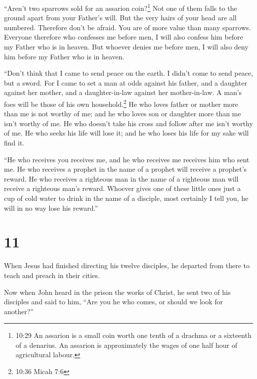  ``Aren't two sparrows sold for an assarion
coin?\footnote{10:29 An assarion is a small coin worth one tenth of a
  drachma or a sixteenth of a denarius. An assarion is approximately the
  wages of one half hour of agricultural labour.} Not one of them falls
to the ground apart from your Father's will.  But the very
hairs of your head are all numbered.  Therefore don't be
afraid. You are of more value than many sparrows.  Everyone
therefore who confesses me before men, I will also confess him before my
Father who is in heaven.  But whoever denies me before men,
I will also deny him before my Father who is in heaven.

 ``Don't think that I came to send peace on the earth. I
didn't come to send peace, but a sword.  For I came to set
a man at odds against his father, and a daughter against her mother, and
a daughter-in-law against her mother-in-law.  A man's foes
will be those of his own household.\footnote{10:36 Micah 7:6}
 He who loves father or mother more than me is not worthy
of me; and he who loves son or daughter more than me isn't worthy of me.
 He who doesn't take his cross and follow after me isn't
worthy of me.  He who seeks his life will lose it; and he
who loses his life for my sake will find it.

 ``He who receives you receives me, and he who receives me
receives him who sent me.  He who receives a prophet in the
name of a prophet will receive a prophet's reward. He who receives a
righteous man in the name of a righteous man will receive a righteous
man's reward.  Whoever gives one of these little ones just
a cup of cold water to drink in the name of a disciple, most certainly I
tell you, he will in no way lose his reward.''

\hypertarget{section-10}{%
\section{11}\label{section-10}}

 When Jesus had finished directing his twelve disciples, he
departed from there to teach and preach in their cities.

 Now when John heard in the prison the works of Christ, he
sent two of his disciples  and said to him, ``Are you he who
comes, or should we look for another?''

